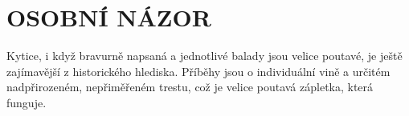 \documentclass[A4paper]{extarticle} %
\begin{document}





\section*{OSOBNÍ NÁZOR}
\noindent 
Kytice, i když bravurně napsaná a jednotlivé balady jsou velice poutavé, je ještě zajímavější z historického hlediska. Příběhy jsou o individuální vině a určitém nadpřirozeném, nepřiměřeném trestu, což je velice poutavá zápletka, která funguje.

\vfill
\end{document}
